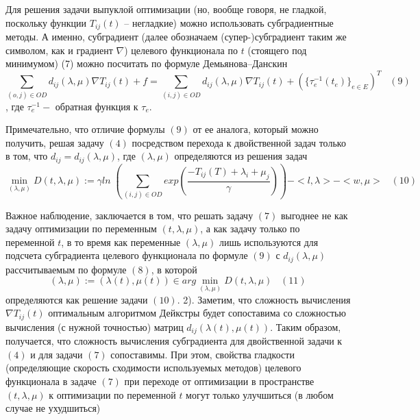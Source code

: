 \documentclass{article}
\begin{document}
Для решения задачи выпуклой оптимизации (но, вообще говоря, не гладкой, поскольку функции $T_{ij}(t)$ – негладкие) можно использовать субградиентные методы. А именно, субградиент (далее обозначаем (супер-)субградиент таким же символом, как и градиент $\nabla$) целевого функционала по $t$ (стоящего под минимумом) (7) можно посчитать по формуле Демьянова–Данскин
$$\sum_{(o,j) \in OD} d_{ij}(\lambda, \mu) \nabla T_{ij}(t) + f = \sum_{(i,j) \in OD} d_{ij}(\lambda, \mu) \nabla T_{ij}(t) + \left( \{ \tau_e^{-1}(t_e) \}_{e \in E} \right)^{T} \;\;\; (9)$$,
где $\tau_e^{-1} - $ обратная функция к $\tau_e$.

Примечательно, что отличие формулы $(9)$ от ее аналога, который можно получить, решая задачу $(4)$ посредством перехода к двойственной задач только в том, что $d_{ij} = d_{ij}(\lambda, \mu)$, где $(\lambda, \mu)$ определяются из решения задач 
$$\min_{(\lambda, \mu)} D(t, \lambda, \mu) := \gamma ln \; \left(\sum_{(i,j) \in OD} exp \left( \frac{-T_{ij}(T) + \lambda_i +\mu_j}{\gamma}\right) \right) - <l, \lambda> - <w, \mu> \;\;\; (10)$$

Важное наблюдение, заключается в том, что решать задачу $(7)$ выгоднее не как задачу оптимизации по переменным $(t, \lambda, \mu)$, а как задачу только по переменной $t$, в то время как переменные $(\lambda, \mu)$ лишь используются для подсчета субградиента целевого функционала по формуле $(9)$ с $d_{ij}(\lambda, \mu)$ рассчитываемым по формуле $(8)$, в которой
$$(\lambda, \mu) := (\lambda (t), \mu (t)) \in arg\min_{(\lambda, \mu)}D(t, \lambda, \mu) \;\;\; (11)$$
определяются как решение задачи $(10)$. 2). Заметим, что сложность вычисления $\nabla T_{ij} (t)$ оптимальным алгоритмом Дейкстры будет сопоставима со сложностью вычисления (с нужной точностью) матриц $d_{ij}(\lambda (t), \mu (t))$.
Таким образом, получается, что сложность вычисления субградиента для двойственной задачи к $(4)$ и для задачи $(7)$ сопоставимы. При этом, свойства гладкости (определяющие скорость сходимости используемых методов) целевого функционала в задаче $(7)$ при переходе от оптимизации в пространстве $(t, \lambda, \mu)$ к оптимизации по переменной $t$ могут только улучшиться (в любом случае не ухудшиться)
\end{document}
